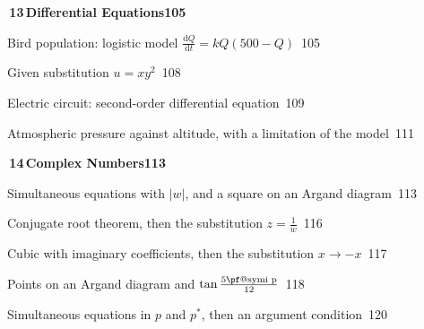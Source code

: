 \documentclass[a4paper,openany]{book}
\begin{document}
{\medskip\noindent\colorbox{blue!8}{\parbox{\dimexpr\textwidth-2\fboxsep}{\large\bfseries\color{blue!50!black}\colorbox{blue!50!black}{\color{white}\,13\,}\quad Differential Equations\hfill 105}}\par\nopagebreak\smallskip\nopagebreak
\noindent{}\quad Bird population: logistic model $\frac {\mathrm {d}Q}{\mathrm {d}t}=kQ(500-Q)$\dotfill\ 105\par
\noindent{}\quad Given substitution $u=xy^{2}$\dotfill\ 108\par
\noindent{}\quad Electric circuit: second-order differential equation\dotfill\ 109\par
\noindent{}\quad Atmospheric pressure against altitude, with a limitation of the model\dotfill\ 111\par
\medskip\noindent\colorbox{blue!8}{\parbox{\dimexpr\textwidth-2\fboxsep}{\large\bfseries\color{blue!50!black}\colorbox{blue!50!black}{\color{white}\,14\,}\quad Complex Numbers\hfill 113}}\par\nopagebreak\smallskip\nopagebreak
\noindent{}\quad Simultaneous equations with $|w|$, and a square on an Argand diagram\dotfill\ 113\par
\noindent{}\quad Conjugate root theorem, then the substitution $z=\frac 1w$\dotfill\ 116\par
\noindent{}\quad Cubic with imaginary coefficients, then the substitution $x\to -x$\dotfill\ 117\par
\noindent{}\quad Points on an Argand diagram and $\tan \frac {5\mathord {\text {\pf@symi \char "70}}}{12}$\dotfill\ 118\par
\noindent{}\quad Simultaneous equations in $p$ and $p^*$, then an argument condition\dotfill\ 120\par
}
\end{document}
